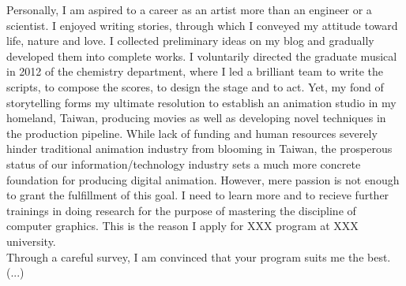 \documentclass[a4paper, 12pt]{article}
\begin{document}

Personally, I am aspired to a career as an artist more than an engineer or a scientist. I enjoyed writing stories, through which I conveyed my attitude toward life, nature and love. I collected preliminary ideas on my blog and gradually developed them into complete works. I voluntarily directed the graduate musical in 2012 of the chemistry department, where I led a brilliant team to write the scripts, to compose the scores, to design the stage and to act. Yet, my fond of storytelling forms my ultimate resolution to establish an animation studio in my homeland, Taiwan, producing movies as well as developing novel techniques in the production pipeline. While lack of funding and human resources severely hinder traditional animation industry from blooming in Taiwan, the prosperous status of our information/technology industry sets a much more concrete foundation for producing digital animation. However, mere passion is not enough to grant the fulfillment of this goal. I need to learn more and to recieve further trainings in doing research for the purpose of mastering the discipline of computer graphics. This is the reason I apply for XXX program at XXX university.\\


Through a careful survey, I am convinced that your program suits me the best. (...)\\
\end{document}
